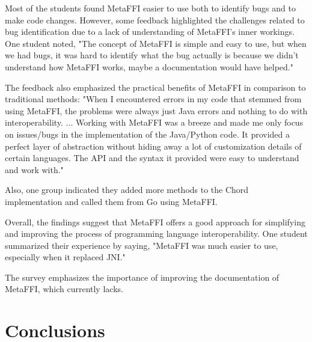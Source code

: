 \documentclass[sigplan,10pt,manuscript,nonacm]{acmart}
\begin{document}
Most of the students found MetaFFI easier to use both to identify bugs and to make code changes. However, some feedback highlighted the challenges related to bug identification due to a lack of understanding of MetaFFI's inner workings. One student noted, "The concept of MetaFFI is simple and easy to use, but when we had bugs, it was hard to identify what the bug actually is because we didn't understand how MetaFFI works, maybe a documentation would have helped."

The feedback also emphasized the practical benefits of MetaFFI in comparison to traditional methods: "When I encountered errors in my code that stemmed from using MetaFFI, the problems were always just Java errors and nothing to do with interoperability. ... Working with MetaFFI was a breeze and made me only focus on issues/bugs in the implementation of the Java/Python code. It provided a perfect layer of abstraction without hiding away a lot of customization details of certain languages. The API and the syntax it provided were easy to understand and work with."

Also, one group indicated they added more methods to the Chord implementation and called them from Go using MetaFFI.

Overall, the findings suggest that MetaFFI offers a good approach for simplifying and improving the process of programming language interoperability. One student summarized their experience by saying, "MetaFFI was much easier to use, especially when it replaced JNI."

The survey emphasizes the importance of improving the documentation of MetaFFI, which currently lacks.


\section{Conclusions}



\end{document}
